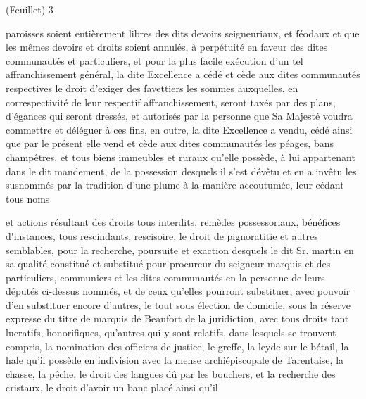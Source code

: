 \documentclass[a4paper,twoside,openany]{article}
\begin{document}

\begin{flushright}
(Feuillet) 3
\end{flushright}	
paroisses soient entièrement libres des dits devoirs 
seigneuriaux, et féodaux et que les mêmes devoirs et
 droits soient annulés, à perpétuité en faveur des 
dites communautés et particuliers, et pour la plus facile 
exécution d’un tel affranchissement général, la dite 
Excellence a cédé et cède aux dites communautés 
respectives le droit d’exiger des \gls{favettiers} les 
sommes auxquelles, en correspectivité de leur 
respectif affranchissement, seront taxés par 
des plans, d'\gls{égances} qui seront dressés, et
 autorisés par la personne que Sa Majesté  voudra 
commettre et déléguer à ces fins, en outre, la 
dite Excellence a vendu, cédé ainsi que par le 
présent elle vend et cède aux dites communautés 
les \gls{péages}, \gls{bans champêtres}, et tous biens 
immeubles et ruraux qu’elle possède, à lui 
appartenant dans le dit mandement, de la 
possession desquels il s’est dévêtu et en a invêtu 
les susnommés par la tradition d’une plume à 
la manière accoutumée, leur cédant tous noms 


et actions résultant des droits tous interdits, 
\gls{remèdes possessoriaux}, \gls{bénéfices d'instances}, tous
\gls{rescindants}, \gls{rescisoire}, le \gls{droit de pignoratitie} et 
autres semblables, pour la recherche, poursuite et 
exaction desquels le dit Sr. martin  en sa qualité
constitué et substitué pour procureur du seigneur
 marquis et des particuliers, communiers et les dites
communautés en la personne de leurs députés ci-dessus
nommés, et de ceux qu'elles pourront substituer, avec
pouvoir d'en substituer encore d'autres, le tout sous 
élection de domicile, sous la réserve expresse du 
titre de marquis de Beaufort de la juridiction, 
avec tous droits tant lucratifs, honorifiques, qu'autres 
qui y sont relatifs, dans lesquels se trouvent 
compris, la \gls{nomination des officiers de justice}, le 
\gls{greffe}, la \gls{leyde sur le bétail}, la \gls{hale} qu’il possède 
en indivision avec la \gls{mense archiépiscopale} de 
Tarentaise, la chasse, la pêche, le \gls{droit des langues 
dû par les bouchers}, et la \gls{recherche des 
cristaux}, le \gls{droit d’avoir un banc placé} ainsi qu'il
\end{document}
